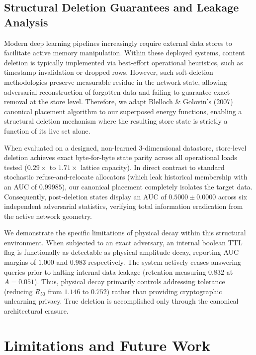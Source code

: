 \documentclass{article}
\begin{document}
\subsection{Structural Deletion Guarantees and Leakage Analysis}\label{sec:deletion}

Modern deep learning pipelines increasingly require external data stores to facilitate active memory manipulation. Within these deployed systems, content deletion is typically implemented via best-effort operational heuristics, such as timestamp invalidation or dropped rows. However, such soft-deletion methodologies preserve measurable residue in the network state, allowing adversarial reconstruction of forgotten data and failing to guarantee exact removal at the store level. Therefore, we adapt Blelloch \& Golovin's (2007) canonical placement algorithm to our superposed energy functions, enabling a structural deletion mechanism where the resulting store state is strictly a function of its live set alone.

When evaluated on a designed, non-learned 3-dimensional datastore, store-level deletion achieves exact byte-for-byte state parity across all operational loads tested ($0.29\times$ to $1.71\times$ lattice capacity). In direct contrast to standard stochastic refuse-and-relocate allocators (which leak historical membership with an AUC of $0.99985$), our canonical placement completely isolates the target data. Consequently, post-deletion states display an AUC of $0.5000\pm0.0000$ across six independent adversarial statistics, verifying total information eradication from the active network geometry.

We demonstrate the specific limitations of physical decay within this structural environment. When subjected to an exact adversary, an internal boolean TTL flag is functionally as detectable as physical amplitude decay, reporting AUC margins of $1.000$ and $0.983$ respectively. The system actively ceases answering queries prior to halting internal data leakage (retention measuring $0.832$ at $A=0.051$). Thus, physical decay primarily controls addressing tolerance (reducing $R_{50}$ from $1.146$ to $0.752$) rather than providing cryptographic unlearning privacy. True deletion is accomplished only through the canonical architectural erasure.

\section{Limitations and Future Work}\label{sec:limits}
\end{document}

